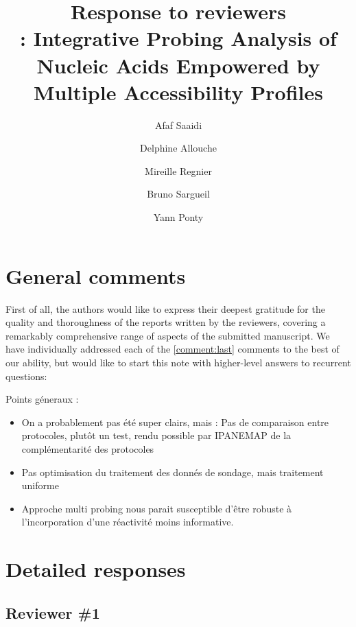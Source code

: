 \documentclass[9pt,hyperref]{article} %
\title{Response to reviewers\\[.3em]\OurTool{}:  Integrative Probing Analysis of Nucleic Acids Empowered by Multiple Accessibility Profiles}
\author{
Afaf Saaidi \and
Delphine Allouche \and
Mireille Regnier \and
Bruno Sargueil \and
Yann Ponty}
\date{} %
\newcommand{\TODO}[2][All]{{\todo[color=blue!10,inline]{\color{black}{TODO (#1)}: #2}}}
\begin{document}
\maketitle

\tableofcontents
\listoftodos


\section{General comments}

	
First of all, the authors would like to express their deepest gratitude for the quality and thoroughness of the reports written by the reviewers, covering a remarkably comprehensive range of aspects of the submitted manuscript. We have individually addressed each of the \ref{comment:last} comments to the best of our ability, but would like to start this note with higher-level answers to recurrent questions:



\TODO[Yann]{Faire résumé}
Points géneraux :
\begin{itemize}
\item On a probablement pas été super clairs, mais :
Pas de comparaison entre protocoles, plutôt un test, rendu possible par IPANEMAP de la complémentarité des protocoles
\item Pas optimisation du traitement des donnés de sondage, mais traitement uniforme
\item Approche multi probing nous parait susceptible d’être robuste à l’incorporation d’une réactivité moins informative.
\end{itemize}

\section{Detailed responses}

\subsection{Reviewer \#1}
\end{document}
